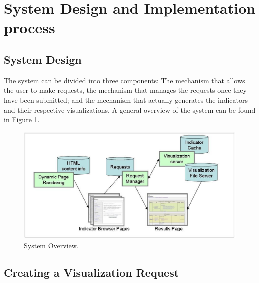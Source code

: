 
\section {System Design and Implementation process}
\label{sec:system-design}

\subsection{System Design}

The system can be divided into three components: The mechanism that allows
the user to make requests, the mechanism that manages the requests once
they have been submitted; and the mechanism that actually generates the
indicators and their respective visualizations.  A general overview of the
system can be found in Figure \ref{fig:system}.

\begin{figure}
\centering
\includegraphics[width =6in]{figs/system}

\caption{\label{fig:system}System Overview.}

\end{figure}

\subsection{Creating a Visualization Request}

